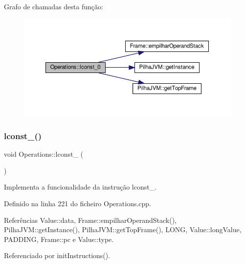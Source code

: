 Grafo de chamadas desta função\+:
\nopagebreak
\begin{figure}[H]
\begin{center}
\leavevmode
\includegraphics[width=350pt]{classOperations_a89586a819a6e67c2168d7d6e43f087ef_cgraph}
\end{center}
\end{figure}
\mbox{\label{classOperations_ae6c6a8e3d75dec712e534434f85909ce}} 
\subsubsection{\texorpdfstring{lconst\+\_()}{lconst\_1()}}
{\footnotesize\ttfamily void Operations\+::lconst\+\_ (\begin{DoxyParamCaption}{ }\end{DoxyParamCaption})\hspace{0.3cm}{\ttfamily [private]}}



Implementa a funcionalidade da instrução lconst\+\_. 



Definido na linha 221 do ficheiro Operations.\+cpp.



Referências Value\+::data, Frame\+::empilhar\+Operand\+Stack(), Pilha\+J\+V\+M\+::get\+Instance(), Pilha\+J\+V\+M\+::get\+Top\+Frame(), L\+O\+NG, Value\+::long\+Value, P\+A\+D\+D\+I\+NG, Frame\+::pc e Value\+::type.



Referenciado por init\+Instructions().

